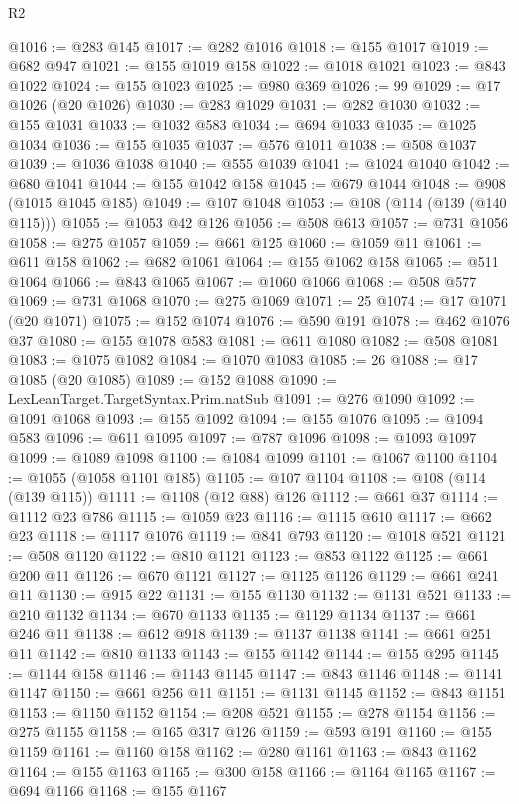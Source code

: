 \begin{lexlean}{R2}
\begin{coremodule}
@1016 := @283 @145
@1017 := @282 @1016
@1018 := @155 @1017
@1019 := @682 @947
@1021 := @155 @1019 @158
@1022 := @1018 @1021
@1023 := @843 @1022
@1024 := @155 @1023
@1025 := @980 @369
@1026 := 99
@1029 := @17 @1026 (@20 @1026)
@1030 := @283 @1029
@1031 := @282 @1030
@1032 := @155 @1031
@1033 := @1032 @583
@1034 := @694 @1033
@1035 := @1025 @1034
@1036 := @155 @1035
@1037 := @576 @1011
@1038 := @508 @1037
@1039 := @1036 @1038
@1040 := @555 @1039
@1041 := @1024 @1040
@1042 := @680 @1041
@1044 := @155 @1042 @158
@1045 := @679 @1044
@1048 := @908 (@1015 @1045 @185)
@1049 := @107 @1048
@1053 := @108 (@114 (@139 (@140 @115)))
@1055 := @1053 @42 @126
@1056 := @508 @613
@1057 := @731 @1056
@1058 := @275 @1057
@1059 := @661 @125
@1060 := @1059 @11
@1061 := @611 @158
@1062 := @682 @1061
@1064 := @155 @1062 @158
@1065 := @511 @1064
@1066 := @843 @1065
@1067 := @1060 @1066
@1068 := @508 @577
@1069 := @731 @1068
@1070 := @275 @1069
@1071 := 25
@1074 := @17 @1071 (@20 @1071)
@1075 := @152 @1074
@1076 := @590 @191
@1078 := @462 @1076 @37
@1080 := @155 @1078 @583
@1081 := @611 @1080
@1082 := @508 @1081
@1083 := @1075 @1082
@1084 := @1070 @1083
@1085 := 26
@1088 := @17 @1085 (@20 @1085)
@1089 := @152 @1088
@1090 := LexLeanTarget.TargetSyntax.Prim.natSub
@1091 := @276 @1090
@1092 := @1091 @1068
@1093 := @155 @1092
@1094 := @155 @1076
@1095 := @1094 @583
@1096 := @611 @1095
@1097 := @787 @1096
@1098 := @1093 @1097
@1099 := @1089 @1098
@1100 := @1084 @1099
@1101 := @1067 @1100
@1104 := @1055 (@1058 @1101 @185)
@1105 := @107 @1104
@1108 := @108 (@114 (@139 @115))
@1111 := @1108 (@12 @88) @126
@1112 := @661 @37
@1114 := @1112 @23 @786
@1115 := @1059 @23
@1116 := @1115 @610
@1117 := @662 @23
@1118 := @1117 @1076
@1119 := @841 @793
@1120 := @1018 @521
@1121 := @508 @1120
@1122 := @810 @1121
@1123 := @853 @1122
@1125 := @661 @200 @11
@1126 := @670 @1121
@1127 := @1125 @1126
@1129 := @661 @241 @11
@1130 := @915 @22
@1131 := @155 @1130
@1132 := @1131 @521
@1133 := @210 @1132
@1134 := @670 @1133
@1135 := @1129 @1134
@1137 := @661 @246 @11
@1138 := @612 @918
@1139 := @1137 @1138
@1141 := @661 @251 @11
@1142 := @810 @1133
@1143 := @155 @1142
@1144 := @155 @295
@1145 := @1144 @158
@1146 := @1143 @1145
@1147 := @843 @1146
@1148 := @1141 @1147
@1150 := @661 @256 @11
@1151 := @1131 @1145
@1152 := @843 @1151
@1153 := @1150 @1152
@1154 := @208 @521
@1155 := @278 @1154
@1156 := @275 @1155
@1158 := @165 @317 @126
@1159 := @593 @191
@1160 := @155 @1159
@1161 := @1160 @158
@1162 := @280 @1161
@1163 := @843 @1162
@1164 := @155 @1163
@1165 := @300 @158
@1166 := @1164 @1165
@1167 := @694 @1166
@1168 := @155 @1167

\end{coremodule}
\end{lexlean}

